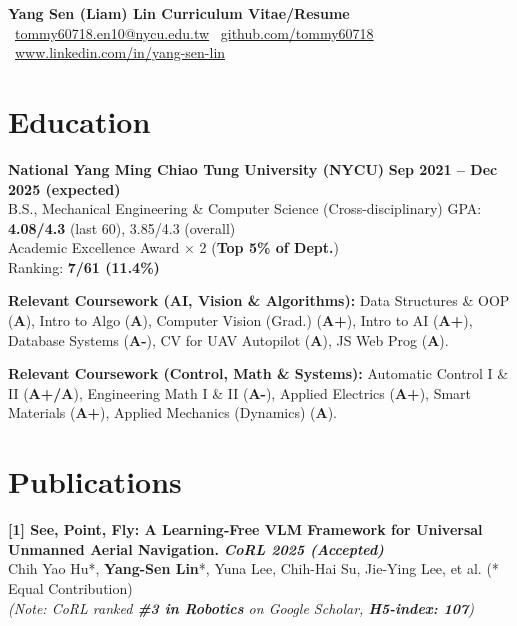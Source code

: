 \documentclass[10pt,letterpaper]{article}
\begin{document}
\begin{center}
  {\Large \bfseries Yang Sen (Liam) Lin \quad\textbar\quad Curriculum Vitae/Resume}\\[4pt]
   \ \href{mailto:tommy60718.en10@nycu.edu.tw}{tommy60718.en10@nycu.edu.tw}
  \quad\textbar\quad
   \ \href{https://github.com/tommy60718}{github.com/tommy60718}
  \quad\textbar\quad
   \ \href{https://www.linkedin.com/in/}{www.linkedin.com/in/yang-sen-lin}
\end{center}

\section*{Education}
\noindent
\textbf{National Yang Ming Chiao Tung University (NYCU)} \hfill \textbf{Sep 2021 – Dec 2025 (expected)}\\
B.S., Mechanical Engineering \& Computer Science (Cross-disciplinary) \hfill GPA: \textbf{4.08/4.3} (last 60), 3.85/4.3 (overall)\\
Academic Excellence Award $\times$ 2 (\textbf{Top 5\% of Dept.})\\
Ranking: \textbf{7/61 (11.4\%)}

\vspace{4pt}
\noindent
\textbf{Relevant Coursework (AI, Vision \& Algorithms):} Data Structures \& OOP (\textbf{A}), Intro to Algo (\textbf{A}), Computer Vision (Grad.) (\textbf{A+}), Intro to AI (\textbf{A+}), Database Systems (\textbf{A-}), CV for UAV Autopilot (\textbf{A}), JS Web Prog (\textbf{A}).

\vspace{2pt}
\noindent
\textbf{Relevant Coursework (Control, Math \& Systems):} Automatic Control I \& II (\textbf{A+/A}), Engineering Math I \& II (\textbf{A-}), Applied Electrics (\textbf{A+}), Smart Materials (\textbf{A+}), Applied Mechanics (Dynamics) (\textbf{A}).

\section*{Publications}
\noindent
\textbf{[1] See, Point, Fly: A Learning-Free VLM Framework for Universal Unmanned Aerial Navigation.} \href{https://spf-web.pages.dev/}{\footnotesize{}} \textit{\textbf{CoRL 2025 (Accepted)}}\\
Chih Yao Hu*, \textbf{Yang-Sen Lin}*, Yuna Lee, Chih-Hai Su, Jie-Ying Lee, et al. (* Equal Contribution)\\
\textit{(Note: CoRL ranked \textbf{\#3 in Robotics} on Google Scholar, \textbf{H5-index: 107})}
\end{document}
